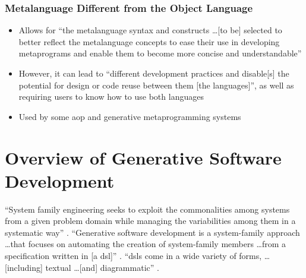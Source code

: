 \subsubsection{Metalanguage Different from the Object Language
      \citep[p.~113:29-31]{lilis_survey_2019}}
\begin{itemize}
      \item Allows for ``the metalanguage syntax and constructs \dots [to be]
            selected to better reflect the metalanguage concepts to ease their
            use in developing metaprograms and enable them to become more
            concise and understandable'' \citep[p.~113:29]{lilis_survey_2019}
      \item However, it can lead to ``different development practices and
            disable[s] the potential for design or code reuse between them [the
                        languages]'', as well as requiring users to know how to
            use both languages \citep[p.~113:30]{lilis_survey_2019}
      \item Used by some \acs{aop} and generative metaprogramming systems
            \citep[p.~113:30]{lilis_survey_2019}
\end{itemize}

\section{Overview of Generative Software Development}
\label{chap:notes:sec:overview-of-gen-soft-dev}

``System family engineering seeks to exploit the commonalities
among systems from a given problem domain while managing the
variabilities among them in a systematic way''
\citep[p.~326]{czarnecki_overview_2004}. ``Generative software development is a
system-family approach \dots that focuses on automating the creation of
system-family members \dots from a specification written in [a \acf{dsl}]''
\citep[p.~327]{czarnecki_overview_2004}. ``\acsp{dsl} come in a wide variety of
forms, \dots [including] textual \dots [and] diagrammatic''
\citep[p.~328]{czarnecki_overview_2004}.

